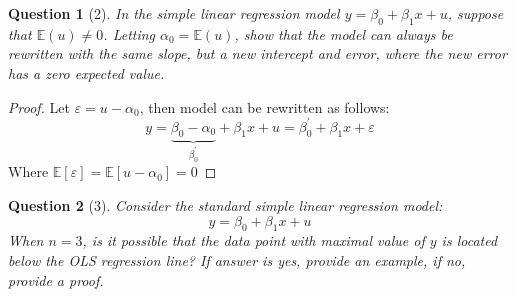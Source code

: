 \documentclass[12pt,reqno]{amsart}
\theoremstyle{plain}
\newcommand{\E}{\mathbb{E}}
\newtheorem*{theorem*}{Question}
\begin{document}
\begin{theorem*}[2]
    \normalfont
    In the simple linear regression model $ y = \beta_{0} +\beta_{1}x + u $, suppose that $ \E (u) \ne 0 $.
    Letting $ \alpha_{0} = \E (u) $, show that the model can always be rewritten with the same slope, but a new
    intercept and error, where the new error has a zero expected value.
\end{theorem*}
\begin{proof}
    Let $ \varepsilon = u - \alpha_{0} $, then model can be rewritten as follows:
    \[
        y = \underbrace{\beta_{0} - \alpha_{0}}_{\beta_0^{'}} + \beta_{1}x + u = \beta_{0}^{'} + \beta_{1}x + \varepsilon
    \]
    Where $ \E [\varepsilon] = \E [u - \alpha_{0}] = 0 $
\end{proof}
\begin{theorem*}[3]
    \normalfont
    Consider the standard simple linear regression model:
    \[
        y = \beta_{0} +\beta_{1}x + u
    \]
    When $ n = 3 $, is it possible that the data point with maximal value of $ y $ is located below
    the OLS regression line? If answer is yes, provide an example, if no, provide a proof.
\end{theorem*}
\end{document}
